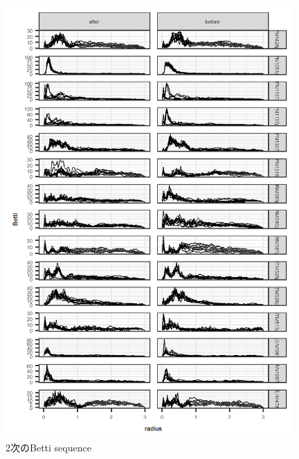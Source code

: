 \documentclass{jarticle}
\begin{document}
\begin{figure}[H]
\begin{center}
	\includegraphics[width=11cm]{fig/betti_2.png}	
	\caption{2次のBetti sequence}\label{fig:betti2}
\end{center}
\end{figure}
\end{document}
